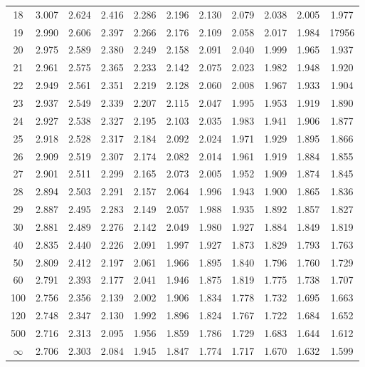 \documentclass[12pt]{article}
\begin{document}
\begin{table}
\begin{center}
{\begin{tabular}{|c|c|c|c|c|c|c|c|c|c|c|}
	18 &3.007 &2.624 &2.416 &  2.286& 2.196& 2.130& 2.079 &  2.038& 2.005&1.977\\
	19 &2.990 &2.606 &2.397& 2.266& 2.176 &  2.109 &  2.058& 2.017 &1.984&17956\\
	20& 2.975 &2.589 &2.380 &2.249 & 2.158 &  2.091& 2.040 &  1.999&1.965 &1.937 \\
	21 &2.961 &2.575 &2.365 &  2.233 &2.142 &2.075 &  2.023 &1.982&1.948& 1.920\\
	22& 2.949 &2.561& 2.351 &  2.219& 2.128&   2.060& 2.008&1.967 &1.933 &1.904 \\
	23 &2.937& 2.549& 2.339& 2.207& 2.115&   2.047 &1.995& 1.953 &1.919&1.890\\
	24 &2.927 &2.538 &2.327 & 2.195&   2.103 &  2.035& 1.983& 1.941&1.906 &1.877 \\
	25 &2.918 &2.528 &2.317 &  2.184 &  2.092 &2.024 &1.971 &1.929&1.895 &1.866\\
	26 &2.909 &2.519 &2.307 &2.174 &2.082 &2.014 &1.961& 1.919&1.884 &1.855\\
	27& 2.901 &2.511 &2.299& 2.165 &2.073 &2.005 &1.952& 1.909&1.874 &1.845\\
	28 &2.894 &2.503 &2.291 &2.157 &2.064 &  1.996 &1.943 &1.900&1.865 &1.836 \\
	29 &2.887 &2.495 &2.283 &2.149 &  2.057& 1.988 &1.935 &1.892 &1.857&1.827\\
	30 &2.881 &2.489 &2.276 &2.142 &2.049 &1.980 &1.927 &1.884 &1.849&1.819\\
	40 &2.835 &2.440 &2.226 &2.091 &1.997 &1.927 &1.873 &1.829 &1.793&1.763\\
	50 &2.809 &2.412 &2.197 &2.061 &1.966 &1.895 &1.840  & 1.796 &1.760&1.729\\
	60 &2.791 &2.393 &2.177 &2.041 &  1.946& 1.875& 1.819 &1.775  &1.738&1.707\\
	100 &2.756 &2.356 &2.139 &2.002 &1.906 &1.834& 1.778 &1.732& 1.695&1.663\\
	120& 2.748 &2.347& 2.130& 1.992& 1.896& 1.824 &1.767& 1.722& 1.684&1.652\\
	500 &2.716& 2.313& 2.095& 1.956& 1.859& 1.786&   1.729& 1.683& 1.644&1.612\\  \hline
	$\infty$ &2.706 &2.303 &2.084 &1.945&   1.847 &  1.774& 1.717&1.670 &1.632& 1.599\\
	\hline
\end{tabular}
}
\end{center}
\end{table}

\end{document}
